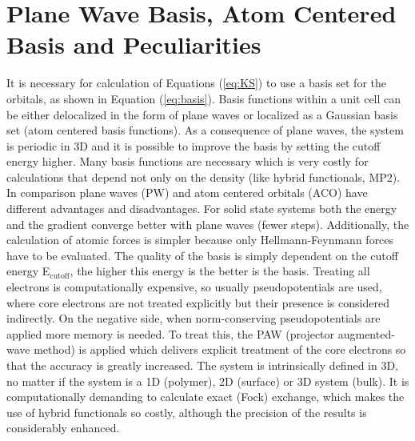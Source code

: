 \documentclass[11pt,DIV=13,BCOR=5mm,a4paper,headinclude]{scrbook}
\begin{document}
\section{Plane Wave Basis, Atom Centered Basis and Peculiarities}
It is necessary for calculation of Equations (\ref{eq:KS}) to use a basis set for the orbitals, as shown in Equation (\ref{eq:basis}).
Basis functions within a unit cell can be either delocalized in the form of plane waves or localized as a Gaussian basis set (atom centered basis functions).
As a consequence of plane waves, the system is periodic in 3D and it is possible to improve the basis by setting the cutoff energy higher.
Many basis functions are necessary which is very costly for calculations that depend not only on the density (like hybrid functionals, MP2).
In comparison plane waves (PW) and atom centered orbitals (ACO) have different advantages and disadvantages\cite{Tosoni2007}.
For solid state systems both the energy and the gradient converge better with plane waves (fewer steps).
Additionally, the calculation of atomic forces is simpler because only Hellmann-Feynmann forces have to be evaluated.
The quality of the basis is simply dependent on the cutoff energy E$_\textrm{cutoff}$, the higher this energy is the better is the basis.
Treating all electrons is computationally expensive, so usually pseudopotentials are used, where core electrons are not treated explicitly but their presence is considered indirectly.
On the negative side, when norm-conserving pseudopotentials are applied more memory is needed.
To treat this, the PAW (projector augmented-wave method)\cite{paw1,Kresse1999} is applied which delivers explicit treatment of the core electrons so that the accuracy is greatly increased.
The system is intrinsically defined in 3D, no matter if the system is a 1D (polymer), 2D (surface) or 3D system (bulk).
It is computationally demanding to calculate exact (Fock) exchange, which makes the use of hybrid functionals so costly, although the precision of the results is considerably enhanced.
\\
\end{document}
